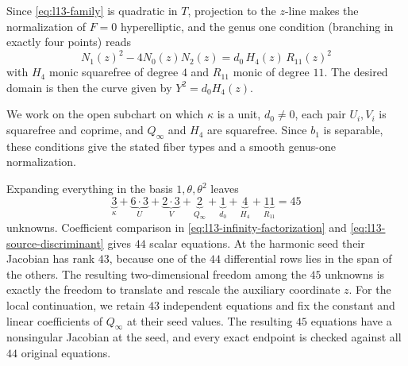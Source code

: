 \documentclass[10pt]{amsart}
\numberwithin{equation}{section}
\theoremstyle{definition}
\theoremstyle{remark}
\begin{document}
Since
\eqref{eq:l13-family} is quadratic in $T$, projection to the $z$-line makes
the normalization of $F=0$ hyperelliptic, and the genus one condition (branching in exactly four points) reads
\begin{equation}\label{eq:l13-source-discriminant}
 N_1(z)^2-4N_0(z)N_2(z)=d_0\,H_4(z)\,R_{11}(z)^2
\end{equation}
with $H_4$ monic squarefree of degree $4$ and $R_{11}$ monic of degree $11$. The desired domain is then the curve given by $Y^2=d_0H_4(z)$.

We work on the open subchart on which $\kappa$ is a unit, $d_0\ne0$, each
pair $U_i,V_i$ is squarefree and coprime, and $Q_\infty$ and $H_4$ are
squarefree.  Since $b_1$ is separable, these conditions give the stated
fiber types and a smooth genus-one normalization.

Expanding everything in the basis $1,\theta,\theta^2$ leaves
\[
 \underbrace{3}_{\kappa}+\underbrace{6\cdot3}_{U}
 +\underbrace{2\cdot3}_{V}+\underbrace{2}_{Q_\infty}
 +\underbrace{1}_{d_0}+\underbrace{4}_{H_4}
 +\underbrace{11}_{R_{11}}=45
\]
unknowns.  Coefficient comparison in
  \eqref{eq:l13-infinity-factorization} and
  \eqref{eq:l13-source-discriminant} gives $44$ scalar equations.  At the
  harmonic seed their Jacobian has rank $43$, because one of the $44$
  differential rows lies in the span of the others.  The resulting
  two-dimensional freedom among the $45$ unknowns is exactly the freedom to
  translate and rescale the auxiliary coordinate $z$.  For the local
  continuation, we retain $43$ independent equations and fix the constant and
  linear coefficients of $Q_\infty$ at their seed values.  The resulting
  $45$ equations have a nonsingular Jacobian at the seed, and every exact
  endpoint is checked against all $44$ original equations.
\end{document}
